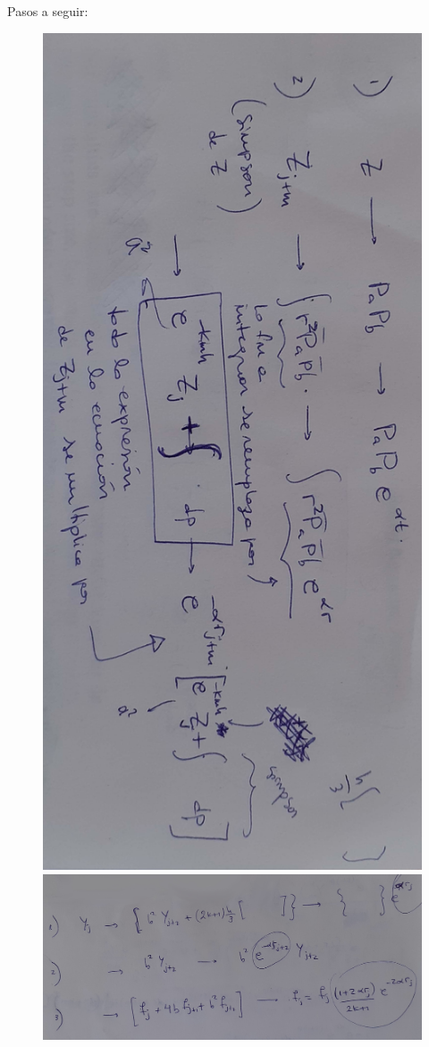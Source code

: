 \documentclass[11pt]{article}
\begin{document}
\newpage
Pasos a seguir:
\begin{figure}[h]
 \includegraphics[width=\textwidth]{Z.jpg} \\
 \includegraphics[width=\textwidth]{Y.jpg}
\end{figure}
\end{document}
